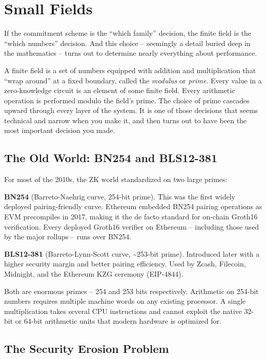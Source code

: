 \documentclass[
  11pt,
  openany]{report}
\renewcommand{\textbf}[1]{{\bfseries\color{MidnightBold}#1}}
\begin{document}
\section{Small Fields}\label{small-fields}

If the commitment scheme is the ``which family'' decision, the finite field is
the ``which numbers'' decision. And this choice -- seemingly a detail buried
deep in the mathematics -- turns out to determine nearly everything about
performance.

A finite field is a set of numbers equipped with addition and multiplication
that ``wrap around'' at a fixed boundary, called the \emph{modulus} or
\emph{prime}. Every value in a zero-knowledge circuit is an element of some
finite field. Every arithmetic operation is performed modulo the field's prime.
The choice of prime cascades upward through every layer of the system. It is one
of those decisions that seems technical and narrow when you make it, and then
turns out to have been the most important decision you made.

\subsection{The Old World: BN254 and
BLS12-381}\label{the-old-world-bn254-and-bls12-381}

For most of the 2010s, the ZK world standardized on two large primes:

\textbf{BN254} (Barreto-Naehrig curve, 254-bit prime). This was the first widely
deployed pairing-friendly curve. Ethereum embedded BN254 pairing operations as
EVM precompiles in 2017, making it the de facto standard for on-chain Groth16
verification. Every deployed Groth16 verifier on Ethereum -- including those
used by the major rollups -- runs over BN254.

\textbf{BLS12-381} (Barreto-Lynn-Scott curve, \textasciitilde253-bit prime).
Introduced later with a higher security margin and better pairing efficiency.
Used by Zcash, Filecoin, Midnight, and the Ethereum KZG ceremony (EIP-4844).

Both are enormous primes -- 254 and 253 bits respectively. Arithmetic on 254-bit
numbers requires multiple machine words on any existing processor. A single
multiplication takes several CPU instructions and cannot exploit the native
32-bit or 64-bit arithmetic units that modern hardware is optimized for.

\subsection{The Security Erosion Problem}\label{the-security-erosion-problem}
\end{document}
